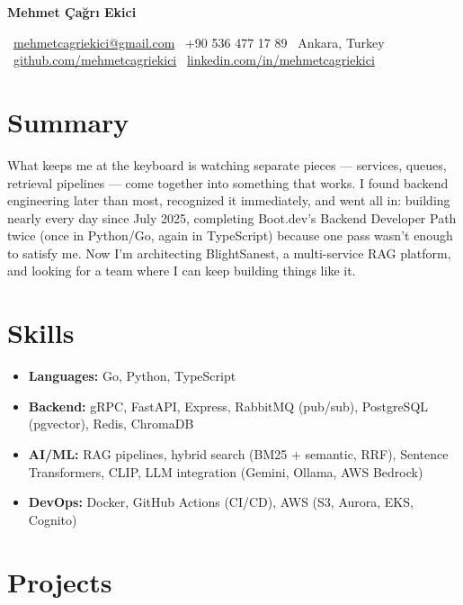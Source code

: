 \documentclass[10pt,a4paper]{article}
\begin{document}
{\huge\bfseries\color{accent} Mehmet Çağrı Ekici}\par
\vspace{4pt}
{
\faEnvelope\ \href{mailto:mehmetcagriekici@gmail.com}{mehmetcagriekici@gmail.com} \quad
\faPhone\ +90 536 477 17 89 \quad
\faMapMarker\ Ankara, Turkey\\[2pt]
\faGithub\ \href{https://github.com/mehmetcagriekici}{github.com/mehmetcagriekici} \quad
\faLinkedin\ \href{https://linkedin.com/in/mehmetcagriekici}{linkedin.com/in/mehmetcagriekici}
}

\section{Summary}
What keeps me at the keyboard is watching separate pieces --- services, queues, retrieval
pipelines --- come together into something that works. I found backend engineering later than
most, recognized it immediately, and went all in: building nearly every day since July 2025,
completing Boot.dev's Backend Developer Path twice (once in Python/Go, again in TypeScript)
because one pass wasn't enough to satisfy me. Now I'm architecting BlightSanest, a
multi-service RAG platform, and looking for a team where I can keep building things like it.

\section{Skills}
\begin{itemize}
  \item \textbf{Languages:} Go, Python, TypeScript
  \item \textbf{Backend:} gRPC, FastAPI, Express, RabbitMQ (pub/sub), PostgreSQL (pgvector), Redis, ChromaDB
  \item \textbf{AI/ML:} RAG pipelines, hybrid search (BM25 + semantic, RRF), Sentence Transformers, CLIP, LLM integration (Gemini, Ollama, AWS Bedrock)
  \item \textbf{DevOps:} Docker, GitHub Actions (CI/CD), AWS (S3, Aurora, EKS, Cognito)
\end{itemize}

\section{Projects}
\end{document}
